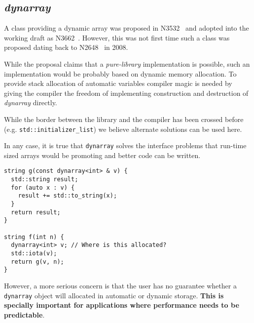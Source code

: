 \subsection{\emph{dynarray}}

A class providing a dynamic array was proposed in N3532~\cite{n3532} and adopted
into the working draft as N3662~\cite{n3662}. However, this was not first time
such a class was proposed dating back to N2648~\cite{n2648} in 2008.

While the proposal claims that a \emph{pure-library} implementation is possible,
such an implementation would be probably based on dynamic memory allocation. To
provide stack allocation of automatic variables compiler magic is needed by
giving the compiler the freedom of implementing construction and destruction of
\emph{dynarray} directly.

While the border between the library and the compiler has been crossed before
(e.g. \verb+std::initializer_list+) we believe alternate solutions can be used
here. 

In any case, it is true that \verb+dynarray+ solves the interface problems that
run-time sized arrays would be promoting and better code can be written.

\begin{lstlisting}
string g(const dynarray<int> & v) {
  std::string result;
  for (auto x : v) {
    result += std::to_string(x);
  }
  return result;
}

string f(int n) {
  dynarray<int> v; // Where is this allocated?
  std::iota(v);
  return g(v, n);
} 
\end{lstlisting}

However, a more serious concern is that the user has no guarantee whether
a \verb+dynarray+ object will allocated in automatic or dynamic storage.
\textbf{This is specially important for applications where performance 
needs to be predictable}.
